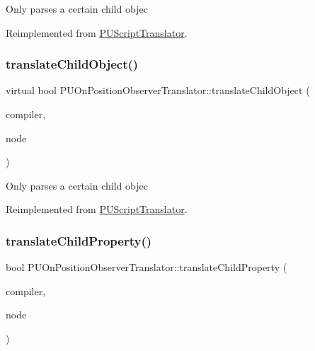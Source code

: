 Only parses a certain child objec 

Reimplemented from \hyperlink{classPUScriptTranslator_ab587d01348ae3e678cb700c719b2b113}{P\+U\+Script\+Translator}.

\mbox{\label{classPUOnPositionObserverTranslator_a18b5d8181f44d69b275284fcce367e01}} 
\subsubsection{\texorpdfstring{translate\+Child\+Object()}{translateChildObject()}\hspace{0.1cm}{\footnotesize\ttfamily [2/2]}}
{\footnotesize\ttfamily virtual bool P\+U\+On\+Position\+Observer\+Translator\+::translate\+Child\+Object (\begin{DoxyParamCaption}\item[{\hyperlink{classPUScriptCompiler}{P\+U\+Script\+Compiler} $\ast$}]{compiler,  }\item[{\hyperlink{classPUAbstractNode}{P\+U\+Abstract\+Node} $\ast$}]{node }\end{DoxyParamCaption})\hspace{0.3cm}{\ttfamily [virtual]}}

Only parses a certain child objec 

Reimplemented from \hyperlink{classPUScriptTranslator_ab587d01348ae3e678cb700c719b2b113}{P\+U\+Script\+Translator}.

\mbox{\label{classPUOnPositionObserverTranslator_a994a0ec8a1b3a7f89b177822ee40390f}} 
\subsubsection{\texorpdfstring{translate\+Child\+Property()}{translateChildProperty()}\hspace{0.1cm}{\footnotesize\ttfamily [1/2]}}
{\footnotesize\ttfamily bool P\+U\+On\+Position\+Observer\+Translator\+::translate\+Child\+Property (\begin{DoxyParamCaption}\item[{\hyperlink{classPUScriptCompiler}{P\+U\+Script\+Compiler} $\ast$}]{compiler,  }\item[{\hyperlink{classPUAbstractNode}{P\+U\+Abstract\+Node} $\ast$}]{node }\end{DoxyParamCaption})\hspace{0.3cm}{\ttfamily [virtual]}}

